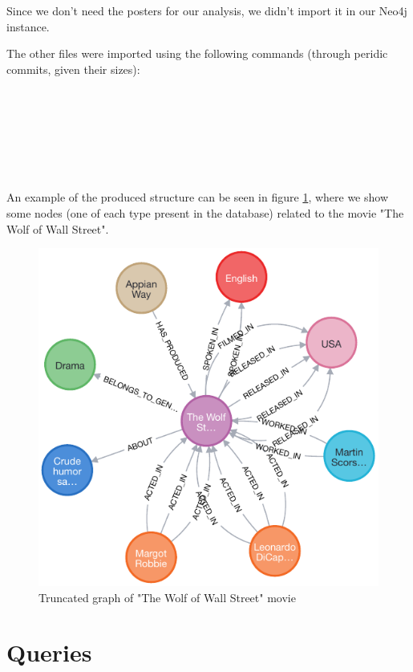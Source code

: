 \documentclass{Configuration_Files/PoliMi3i_thesis}
\begin{document}
Since we don't need the posters for our analysis, we didn't import it in our Neo4j instance.

The other files were imported using the following commands (through peridic commits, given their sizes):

\inputminted[frame=single,framesep=10pt,breaklines]{cypher}{letterboxd/import/movies.cypher}
\inputminted[frame=single,framesep=10pt,breaklines]{cypher}{letterboxd/import/actors.cypher}
\inputminted[frame=single,framesep=10pt,breaklines]{cypher}{letterboxd/import/crew.cypher}
\inputminted[frame=single,framesep=10pt,breaklines]{cypher}{letterboxd/import/languages.cypher}
\inputminted[frame=single,framesep=10pt,breaklines]{cypher}{letterboxd/import/studio.cypher}
\inputminted[frame=single,framesep=10pt,breaklines]{cypher}{letterboxd/import/country.cypher}
\inputminted[frame=single,framesep=10pt,breaklines]{cypher}{letterboxd/import/genre.cypher}
\inputminted[frame=single,framesep=10pt,breaklines]{cypher}{letterboxd/import/theme.cypher}
\inputminted[frame=single,framesep=10pt,breaklines]{cypher}{letterboxd/import/release.cypher}

An example of the produced structure can be seen in figure \ref{fig:graph_example}, where we show some nodes (one of each type present in the database) related to the movie "The Wolf of Wall Street".
\begin{figure}[!h]
    \centering
    \includegraphics[width=0.6\linewidth]{Project Template/letterboxd/graph_example.pdf}
    \caption{Truncated graph of "The Wolf of Wall Street" movie}
    \label{fig:graph_example}
\end{figure}

\chapter{Queries}
\end{document}
